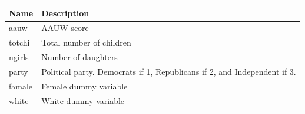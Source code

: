 \documentclass[]{book}
\begin{document}
\begin{longtable}[]{@{}ll@{}}
\toprule
\begin{minipage}[b]{0.17\columnwidth}\raggedright\strut
Name\strut
\end{minipage} & \begin{minipage}[b]{0.67\columnwidth}\raggedright\strut
Description\strut
\end{minipage}\tabularnewline
\midrule
\endhead
\begin{minipage}[t]{0.17\columnwidth}\raggedright\strut
aauw\strut
\end{minipage} & \begin{minipage}[t]{0.67\columnwidth}\raggedright\strut
AAUW score\strut
\end{minipage}\tabularnewline
\begin{minipage}[t]{0.17\columnwidth}\raggedright\strut
totchi\strut
\end{minipage} & \begin{minipage}[t]{0.67\columnwidth}\raggedright\strut
Total number of children\strut
\end{minipage}\tabularnewline
\begin{minipage}[t]{0.17\columnwidth}\raggedright\strut
ngirls\strut
\end{minipage} & \begin{minipage}[t]{0.67\columnwidth}\raggedright\strut
Number of daughters\strut
\end{minipage}\tabularnewline
\begin{minipage}[t]{0.17\columnwidth}\raggedright\strut
party\strut
\end{minipage} & \begin{minipage}[t]{0.67\columnwidth}\raggedright\strut
Political party. Democrats if 1, Republicans if 2, and Independent if
3.\strut
\end{minipage}\tabularnewline
\begin{minipage}[t]{0.17\columnwidth}\raggedright\strut
famale\strut
\end{minipage} & \begin{minipage}[t]{0.67\columnwidth}\raggedright\strut
Female dummy variable\strut
\end{minipage}\tabularnewline
\begin{minipage}[t]{0.17\columnwidth}\raggedright\strut
white\strut
\end{minipage} & \begin{minipage}[t]{0.67\columnwidth}\raggedright\strut
White dummy variable\strut
\end{minipage}\tabularnewline

\end{longtable}
\end{document}
